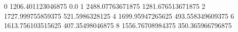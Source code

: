 0 1206.401123046875 0.0
1 2488.07763671875 1281.676513671875
2 1727.999755859375 521.5986328125
4 1699.95947265625 493.558349609375
6 1613.756103515625 407.35498046875
8 1556.76708984375 350.365966796875
